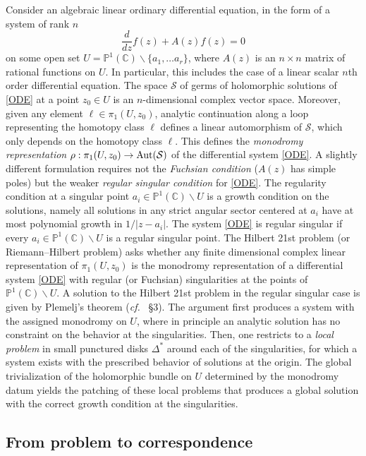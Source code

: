 \documentclass[10pt]{amsart}
\def\C{{\mathbb C}}
\def\bP{{\mathbb P}}
\newcommand{\cf}{{\it cf.\/}\ }
\numberwithin{equation}{section}
\begin{document}
Consider an algebraic linear ordinary
 differential equation, in the form of a system of rank $n$
 \begin{equation}\label{ODE}
 \frac{d}{dz} f(z) + A(z) f(z) =0
 \end{equation}
 on some open set $U=
 \bP^1(\C)\smallsetminus \{ a_1,\ldots a_r \}$,
 where $A(z)$ is an $n\times n$ matrix of rational
 functions on $U$. In particular, this includes the case of a
 linear scalar $n$th order differential equation.
The space ${\mathcal S}$ of germs of holomorphic solutions of
 \eqref{ODE} at a point $z_0\in U$ is an $n$-dimensional complex
 vector space. Moreover, given any element $\ell \in
 \pi_1(U,z_0)$, analytic continuation along a loop representing the
 homotopy class $\ell$ defines a linear automorphism of
 ${\mathcal S}$, which only depends on the homotopy class $\ell$.
 This defines the {\em monodromy representation} $\rho:
 \pi_1(U,z_0) \to {\rm Aut}({\mathcal S})$ of the differential
 system \eqref{ODE}.
A slightly different formulation requires not the {\em Fuchsian
condition} ($A(z)$ has simple poles) but the weaker {\em regular
singular condition} for \eqref{ODE}. The regularity condition at a
singular point $a_i \in \bP^1(\C)\smallsetminus U$ is a growth
condition on the solutions, namely all solutions in any strict
angular sector centered at $a_i$ have at most polynomial growth in
$1/|z-a_i|$. The system \eqref{ODE} is regular singular if every
$a_i \in \bP^1(\C)\smallsetminus U$ is a regular singular point.
The Hilbert 21st problem (or Riemann--Hilbert problem) asks
whether any finite dimensional complex linear representation of
$\pi_1(U,z_0)$ is the monodromy representation of a differential
system \eqref{ODE} with regular (or Fuchsian) singularities at the
points of $\bP^1(\C)\smallsetminus U$. A solution to the Hilbert
21st problem in the regular singular case is given by Plemelj's
theorem (\cf \cite{AnBol} \S 3). The argument
 first produces a system with the assigned monodromy on
 $U$, where in principle an analytic solution has no constraint on the
 behavior at the singularities.
 Then, one restricts to a {\em local problem} in small
 punctured disks $\Delta^*$ around each of the singularities, for
which a system
 exists with the prescribed behavior of solutions at the origin. The
 global trivialization of the holomorphic bundle on $U$ determined by
 the monodromy datum yields the
 patching of these local problems that produces a global
 solution with the correct growth condition at the singularities.

\medskip
\subsection*{From problem to correspondence}\hfill\medskip
\end{document}
